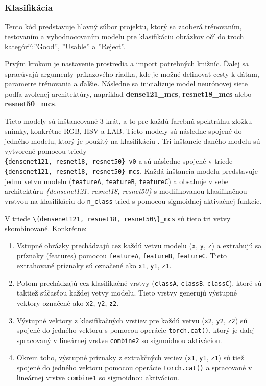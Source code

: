 \documentclass[a4paper, 11pt]{article}
\begin{document}
\subsubsection{Klasifikácia}

Tento kód predstavuje hlavný súbor projektu, ktorý sa zaoberá trénovaním, testovaním a vyhodnocovaním modelu pre klasifikáciu obrázkov očí do troch kategórií:''Good'', ''Usable'' a ''Reject''. 

Prvým krokom je nastavenie prostredia a import potrebných knižníc. Ďalej sa spracúvajú argumenty príkazového riadka, kde je možné definovať cesty k dátam, parametre trénovania a ďalšie. Následne sa inicializuje model neurónovej siete podľa zvolenej architektúry, napríklad \textbf{dense121\_mcs}, \textbf{resnet18\_mcs }alebo \textbf{resnet50\_mcs}.

Tieto modely sú inštancované 3 krát, a to pre každú farebnú spektrálnu zložku snímky, konkrétne RGB, HSV a LAB. Tieto modely sú následne spojené do jedného modelu, ktorý je použitý na klasifikáciu \cite{evaluation}. Tri inštancie daného modelu sú vytvorené pomocou triedy \\\verb|{densenet121, resnet18, resnet50}_v0| a sú následne spojené v triede\\\verb|{densenet121, resnet18, resnet50}_mcs|. Každá inštancia modelu predstavuje jednu vetvu modelu (\verb|featureA|, \verb|featureB|, \verb|featureC|) a obsahuje v sebe architektúru \textit{\{densenet121, resnet18, resnet50\} }s modifikovanou klasifikačnou vrstvou na klasifikáciu do \verb|n_class| tried s pomocou sigmoidnej aktivačnej funkcie.

V triede \verb|\{densenet121, resnet18, resnet50\}_mcs| sú tieto tri vetvy skombinované. Konkrétne:

\begin{enumerate}
    \item Vstupné obrázky prechádzajú cez každú vetvu modelu (\verb|x|, \verb|y|, \verb|z|) a extrahujú sa príznaky (features) pomocou \verb|featureA|, \verb|featureB|, \verb|featureC|. Tieto extrahované príznaky sú označené ako \verb|x1|, \verb|y1|, \verb|z1|.
    \item Potom prechádzajú cez klasifikačné vrstvy (\verb|classA|, \verb|classB|, \verb|classC|), ktoré sú taktiež súčasťou každej vetvy modelu. Tieto vrstvy generujú výstupné vektory označené ako \verb|x2|, \verb|y2|, \verb|z2|.
    \item Výstupné vektory z klasifikačných vrstiev pre každú vetvu (\verb|x2|, \verb|y2|, \verb|z2|) sú spojené do jedného vektoru s pomocou operácie \verb|torch.cat()|, ktorý je ďalej spracovaný v lineárnej vrstve \verb|combine2| so sigmoidnou aktiváciou.
    \item Okrem toho, výstupné príznaky z extrakčných vetiev (\verb|x1|, \verb|y1|, \verb|z1|) sú tiež spojené do jedného vektoru pomocou operácie \verb|torch.cat()| a spracované v lineárnej vrstve \verb|combine1| so sigmoidnou aktiváciou.
\end{enumerate}
\end{document}
